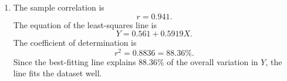 \documentclass[12pt]{article}
\begin{document}
\begin{enumerate}[label=(\arabic*), leftmargin=*]
\item
The sample correlation is
\[
r=0.941.
\]
The equation of the least-squares line is
\[
Y=0.561+0.5919X.
\]
The coefficient of determination is
\[
r^2=0.8836=88.36\%.
\]
Since the best-fitting line explains $88.36\%$ of the overall variation in $Y$, the line fits the dataset well.

\end{enumerate}
\end{document}
